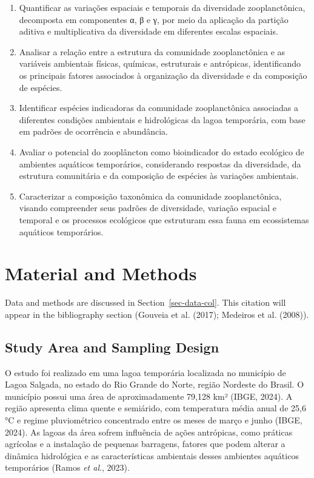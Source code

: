 \documentclass[
  american,
  letterpaper,
  DIV=11,
  numbers=noendperiod]{scrartcl}
\begin{document}
\begin{enumerate}
\def\labelenumi{\arabic{enumi}.}
\item
  Quantificar as variações espaciais e temporais da diversidade
  zooplanctônica, decomposta em componentes α, β e γ, por meio da
  aplicação da partição aditiva e multiplicativa da diversidade em
  diferentes escalas espaciais.
\item
  Analisar a relação entre a estrutura da comunidade zooplanctônica e as
  variáveis ambientais físicas, químicas, estruturais e antrópicas,
  identificando os principais fatores associados à organização da
  diversidade e da composição de espécies.
\item
  Identificar espécies indicadoras da comunidade zooplanctônica
  associadas a diferentes condições ambientais e hidrológicas da lagoa
  temporária, com base em padrões de ocorrência e abundância.
\item
  Avaliar o potencial do zooplâncton como bioindicador do estado
  ecológico de ambientes aquáticos temporários, considerando respostas
  da diversidade, da estrutura comunitária e da composição de espécies
  às variações ambientais.
\item
  Caracterizar a composição taxonômica da comunidade zooplanctônica,
  visando compreender seus padrões de diversidade, variação espacial e
  temporal e os processos ecológicos que estruturam essa fauna em
  ecossistemas aquáticos temporários.
\end{enumerate}

\section{Material and Methods}\label{material-and-methods}

Data and methods are discussed in Section~\ref{sec-data-col}. This
citation will appear in the bibliography section (Gouveia et al. (2017);
Medeiros et al. (2008)).

\subsection{Study Area and Sampling
Design}\label{study-area-and-sampling-design}

O estudo foi realizado em uma lagoa temporária localizada no município
de Lagoa Salgada, no estado do Rio Grande do Norte, região Nordeste do
Brasil. O município possui uma área de aproximadamente 79,128 km² (IBGE,
2024). A região apresenta clima quente e semiárido, com temperatura
média anual de 25,6 °C e regime pluviométrico concentrado entre os meses
de março e junho (IBGE, 2024). As lagoas da área sofrem influência de
ações antrópicas, como práticas agrícolas e a instalação de pequenas
barragens, fatores que podem alterar a dinâmica hidrológica e as
características ambientais desses ambientes aquáticos temporários (Ramos
\emph{et al}., 2023).
\end{document}

